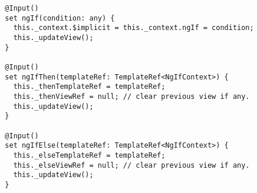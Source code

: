 \begin{verbatim}
  @Input()
  set ngIf(condition: any) {
    this._context.$implicit = this._context.ngIf = condition;
    this._updateView();
  }

  @Input()
  set ngIfThen(templateRef: TemplateRef<NgIfContext>) {
    this._thenTemplateRef = templateRef;
    this._thenViewRef = null; // clear previous view if any.
    this._updateView();
  }

  @Input()
  set ngIfElse(templateRef: TemplateRef<NgIfContext>) {
    this._elseTemplateRef = templateRef;
    this._elseViewRef = null; // clear previous view if any.
    this._updateView();
  }
\end{verbatim}
